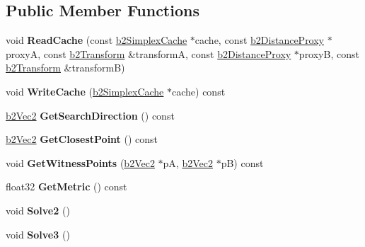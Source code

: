\subsection*{Public Member Functions}
\begin{DoxyCompactItemize}
\item 
\mbox{\label{structb2Simplex_ada29ffb34774589d2e4686316104ddbc}} 
void {\bfseries Read\+Cache} (const \hyperlink{structb2SimplexCache}{b2\+Simplex\+Cache} $\ast$cache, const \hyperlink{structb2DistanceProxy}{b2\+Distance\+Proxy} $\ast$proxyA, const \hyperlink{structb2Transform}{b2\+Transform} \&transformA, const \hyperlink{structb2DistanceProxy}{b2\+Distance\+Proxy} $\ast$proxyB, const \hyperlink{structb2Transform}{b2\+Transform} \&transformB)
\item 
\mbox{\label{structb2Simplex_a8161f17ee71e0620b63842a05776dd4b}} 
void {\bfseries Write\+Cache} (\hyperlink{structb2SimplexCache}{b2\+Simplex\+Cache} $\ast$cache) const
\item 
\mbox{\label{structb2Simplex_af29facd0f4138b32929b575e74ecabd9}} 
\hyperlink{structb2Vec2}{b2\+Vec2} {\bfseries Get\+Search\+Direction} () const
\item 
\mbox{\label{structb2Simplex_a2044bf067dd5f65d63f96ca6e1dded45}} 
\hyperlink{structb2Vec2}{b2\+Vec2} {\bfseries Get\+Closest\+Point} () const
\item 
\mbox{\label{structb2Simplex_ac0ce6596bc03509851efb79e8824c1cd}} 
void {\bfseries Get\+Witness\+Points} (\hyperlink{structb2Vec2}{b2\+Vec2} $\ast$pA, \hyperlink{structb2Vec2}{b2\+Vec2} $\ast$pB) const
\item 
\mbox{\label{structb2Simplex_a9ca3fb6a480b36f80c3eadfb2b387d02}} 
float32 {\bfseries Get\+Metric} () const
\item 
\mbox{\label{structb2Simplex_a449fa9b3f63d7f49535dfe9767f1b9bd}} 
void {\bfseries Solve2} ()
\item 
\mbox{\label{structb2Simplex_a7835361343a7388b8f15c94c8deb48c6}} 
void {\bfseries Solve3} ()
\end{DoxyCompactItemize}

